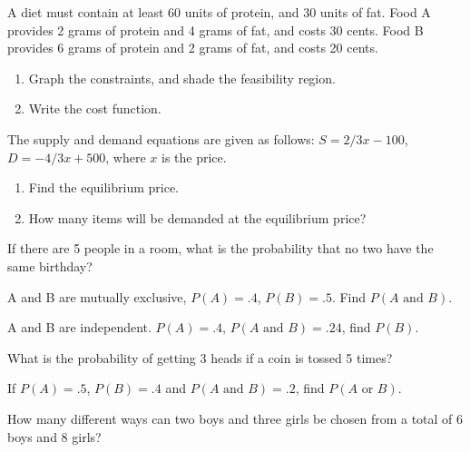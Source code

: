 \begin{puzzle}
    A diet must contain at least 60 units of protein, and 30 units of fat. Food A provides 2 grams of protein and 4 grams of fat, and costs 30 cents. Food B provides 6 grams of protein and 2 grams of fat, and costs 20 cents.
    \begin{enumerate}
        \item Graph the constraints, and shade the feasibility region.
        \item Write the cost function.
    \end{enumerate}
\end{puzzle}

\begin{puzzle}
    The supply and demand equations are given as follows: $S = 2/3x - 100$, $D = -4/3x + 500$, where $x$ is the price.

    \begin{enumerate}
        \item Find the equilibrium price.
        \item How many items will be demanded at the equilibrium price?
    \end{enumerate}
\end{puzzle}

\begin{puzzle}
    If there are 5 people in a room, what is the probability that no two have the same birthday?
\end{puzzle}

\begin{puzzle}
    A and B are mutually exclusive, $P(A) = .4$, $P(B) = .5$. Find $P(A \text{ and } B)$.
\end{puzzle}

\begin{puzzle}
    A and B are independent. $P(A) = .4$, $P(A \text{ and } B) = .24$, find $P(B)$.
\end{puzzle}

\begin{puzzle}
    What is the probability of getting 3 heads if a coin is tossed 5 times?
\end{puzzle}

\begin{puzzle}
    If $P(A) = .5$, $P(B) = .4$ and $P(A \text{ and } B) = .2$, find $P(A \text{ or } B)$.
\end{puzzle}

\begin{puzzle}
    How many different ways can two boys and three girls be chosen from a total of 6 boys and 8 girls?
\end{puzzle}


